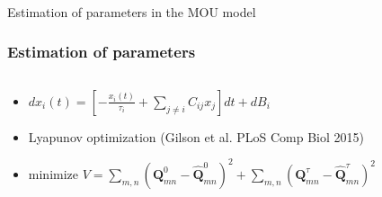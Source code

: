 \documentclass[final]{beamer}
\begin{document}
\begin{frame}
\frametitle{}
\begin{center}
\huge{Estimation of parameters in the MOU model}
\end{center}
\end{frame}

\begin{frame}
\transdissolve
\frametitle{Estimation of parameters}
\begin{columns}
\begin{column}{0.5\textwidth}
\begin{itemize}
	\item $dx_i(t) = [-\frac{x_i(t)}{\tau_i} + \sum_{j\ne i} C_{ij} x_j]dt + dB_i$
		\pause
	\item Lyapunov optimization (Gilson et al. PLoS Comp Biol 2015)
	\item minimize $V = \sum_{m,n} (\mathbf{Q}_{mn}^0 - \mathbf{\hat{Q}}_{mn}^0)^2 + \sum_{m,n} (\mathbf{Q}_{mn}^{\tau} - \mathbf{\hat{Q}}_{mn}^{\tau})^2$
\end{itemize}
\end{column}
\begin{column}{0.5\textwidth}
	\begin{center}
	\end{center}
\end{column}
\end{columns}
\end{frame}
\end{document}
